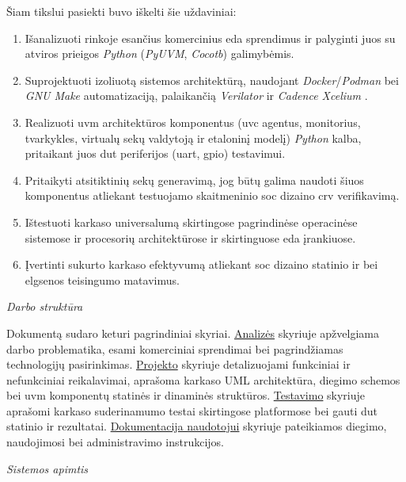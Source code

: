 Šiam tikslui pasiekti buvo iškelti šie uždaviniai:
\begin{enumerate}
	\item Išanalizuoti rinkoje esančius komercinius \gls{eda}  sprendimus ir palyginti juos su atviros prieigos \textit{Python} (\textit{PyUVM}, \textit{Cocotb}) galimybėmis.
	\item Suprojektuoti izoliuotą sistemos architektūrą, naudojant \textit{Docker}/\textit{Podman}  bei \textit{GNU Make} automatizaciją, palaikančią \textit{Verilator} ir \textit{Cadence Xcelium} .
	\item Realizuoti \gls{uvm} architektūros komponentus (\gls{uvc} agentus, monitorius, tvarkykles, virtualų sekų valdytoją ir etaloninį modelį) \textit{Python} kalba, pritaikant juos \gls{dut} periferijos (\gls{uart}, \gls{gpio}) testavimui.
	\item Pritaikyti atsitiktinių sekų generavimą, jog būtų galima naudoti šiuos komponentus atliekant testuojamo skaitmeninio \gls{soc} dizaino \gls{crv} verifikavimą.
	\item Ištestuoti karkaso universalumą skirtingose pagrindinėse operacinėse sistemose ir procesorių architektūrose ir skirtinguose \gls{eda} įrankiuose.
	\item Įvertinti sukurto karkaso efektyvumą atliekant \gls{soc} dizaino statinio ir  bei elgsenos teisingumo matavimus.
\end{enumerate}

\textit{Darbo struktūra}

Dokumentą sudaro keturi pagrindiniai skyriai. \hyperref[section:analysis]{Analizės} skyriuje apžvelgiama darbo problematika, esami komerciniai sprendimai bei pagrindžiamas technologijų pasirinkimas. \hyperref[section:project]{Projekto} skyriuje detalizuojami funkciniai ir nefunkciniai reikalavimai, aprašoma karkaso UML architektūra,  diegimo schemos bei \gls{uvm} komponentų statinės ir dinaminės struktūros. \hyperref[section:testing]{Testavimo} skyriuje aprašomi karkaso suderinamumo testai skirtingose platformose bei gauti \gls{dut} statinio ir  rezultatai. \hyperref[section:documentation]{Dokumentacija naudotojui} skyriuje pateikiamos diegimo, naudojimosi bei administravimo instrukcijos.

\textit{Sistemos apimtis}

